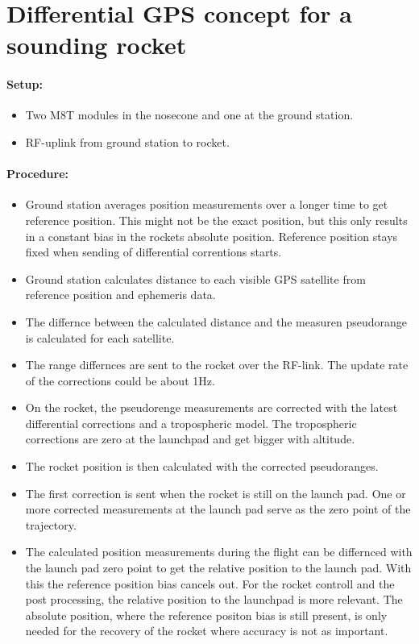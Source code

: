 \chapter{Differential GPS concept for a sounding rocket}

\subsubsection{Setup:}
\begin{itemize}
 \item Two M8T modules in the nosecone and one at the ground station.
 
 \item RF-uplink from ground station to rocket.
\end{itemize}


\subsubsection{Procedure:}
\begin{itemize}
 \item Ground station averages position measurements over a longer time to get reference position. 
 This might not be the exact position, but this only results in a constant bias in the rockets absolute position. 
 Reference position stays fixed when sending of differential correntions starts.
 
 \item Ground station calculates distance to each visible GPS satellite from reference position and ephemeris data.
 
 \item The differnce between the calculated distance and the measuren pseudorange is calculated for each satellite.
 
 \item The range differnces are sent to the rocket over the RF-link. 
 The update rate of the corrections could be about 1Hz.
 
 \item On the rocket, the pseudorenge measurements are corrected with the latest differential corrections and a tropospheric model. 
 The tropospheric corrections are zero at the launchpad and get bigger with altitude.
 
 \item The rocket position is then calculated with the corrected pseudoranges.
 
 \item The first correction is sent when the rocket is still on the launch pad.
 One or more corrected measurements at the launch pad serve as the zero point of the trajectory.
 
 \item The calculated position measurements during the flight can be differnced with the launch pad zero point to get the relative position to the launch pad.
 With this the reference position bias cancels out.
 For the rocket controll and the post processing, the relative position to the launchpad is more relevant.
 The absolute position, where the reference positon bias is still present, is only needed for the recovery of the rocket where accuracy is not as important.
\end{itemize}